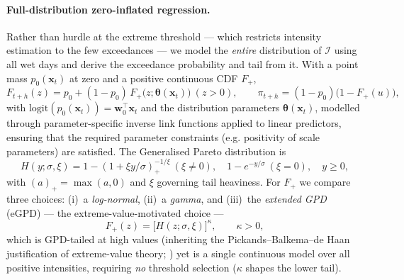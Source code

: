 \documentclass[11pt,a4paper]{article}
\newcommand{\Ind}{\mathcal{I}}                 %
\newcommand{\bx}{\bm{x}}
\begin{document}
\paragraph{Full-distribution zero-inflated regression.} Rather than hurdle at the
extreme threshold --- which restricts intensity estimation to the few
exceedances --- we model the \emph{entire} distribution of $\Ind$ using all wet
days and derive the exceedance probability and tail from it. With a point mass
$p_0(\bx_t)$ at zero and a positive continuous CDF $F_+$,
\begin{equation}\label{eq:zi}
F_{t+h}(z) = p_0 + (1-p_0)\,F_+\!\big(z;\bm\theta(\bx_t)\big)\ (z>0),
\qquad \pi_{t+h}=(1-p_0)\big(1-F_+(u)\big),
\end{equation}
with $\mathrm{logit}(p_0(\bx_t)) = \mathbf{w}_0^\top\bx_t$ and the distribution parameters $\bm\theta(\bx_t)$, modelled through parameter-specific inverse link functions applied to linear predictors,
ensuring that the required parameter constraints (e.g. positivity of scale parameters) are satisfied.
The Generalised Pareto distribution is
\begin{equation}\label{eq:gpd}
H(y;\sigma,\xi) = 1-\left(1+\xi y/\sigma\right)_{+}^{-1/\xi}\ (\xi\neq0),\quad
1-e^{-y/\sigma}\ (\xi=0),\quad y\ge0,
\end{equation}
with $(a)_+=\max(a,0)$ and $\xi$ governing tail heaviness. For $F_+$ we compare three choices: (i)~a \emph{log-normal}, (ii)~a \emph{gamma}, and (iii)~the \emph{extended GPD} (eGPD) \citep{naveau2016egpd} --- the extreme-value-motivated choice ---
\begin{equation}\label{eq:egpd}
F_+(z) = \big[H(z;\sigma,\xi)\big]^{\kappa},\qquad \kappa>0,
\end{equation}
which is GPD-tailed at high values (inheriting the Pickands--Balkema--de Haan
justification of extreme-value theory; \citealp{coles2001evt}) yet is a single
continuous model over all positive intensities, requiring \emph{no} threshold
selection ($\kappa$ shapes the lower tail).
\end{document}
